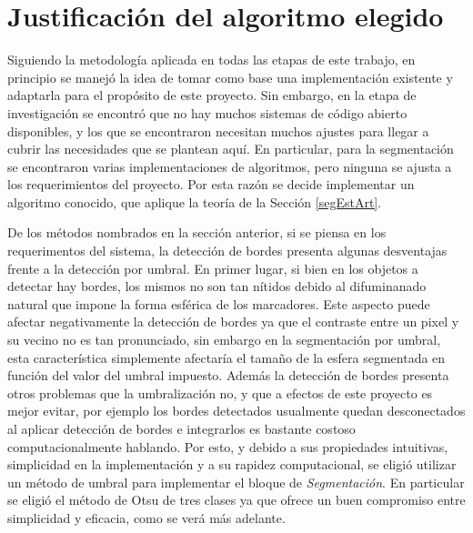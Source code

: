 

\section{Justificación del algoritmo elegido}

Siguiendo la metodología aplicada en todas las etapas de este trabajo, en principio se manejó la idea de tomar como base una implementación existente y adaptarla para el propósito de este proyecto. Sin embargo, en la etapa de investigación se encontró que no hay muchos sistemas de código abierto disponibles, y los que se encontraron necesitan muchos ajustes para llegar a cubrir las necesidades que se plantean aquí. En particular, para la segmentación se encontraron varias implementaciones de algoritmos, pero ninguna se ajusta a los requerimientos del proyecto. Por esta razón se decide implementar un algoritmo conocido, que aplique la teoría de la Sección \ref{segEstArt}.

De los métodos nombrados en la sección anterior, si se piensa en los requerimentos del sistema, la detección de bordes presenta algunas desventajas frente a la detección por umbral. En primer lugar, si bien en los objetos a detectar hay bordes, los mismos no son tan nítidos debido al difuminanado natural que impone la forma esférica de los marcadores. Este aspecto puede afectar negativamente la detección de bordes ya que el contraste entre un pixel y su vecino no es tan pronunciado, sin embargo en la segmentación por umbral, esta característica simplemente afectaría el tamaño de la esfera segmentada en función del valor del umbral impuesto. Además la detección de bordes presenta otros problemas que la umbralización no, y que a efectos de este proyecto es mejor evitar, por ejemplo los bordes detectados usualmente quedan desconectados al aplicar detección de bordes e integrarlos es bastante costoso computacionalmente hablando. Por esto, y debido a sus propiedades intuitivas, simplicidad en la implementación y a su rapidez computacional, se eligió utilizar un método de umbral para implementar el bloque de \emph{Segmentación}. En particular se eligió el método de Otsu \cite{otsu} de tres clases ya que ofrece un buen compromiso entre simplicidad y eficacia, como se verá más adelante. 

